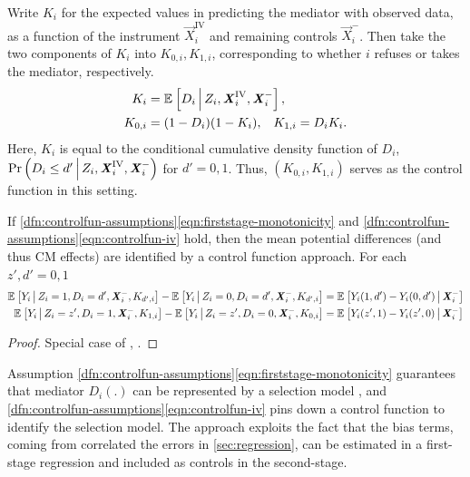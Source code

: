 Write $K_i$ for the expected values in predicting the mediator with observed data, as a function of the instrument $\vec X_i^{\text{IV}}$ and remaining controls $\vec X_i^-$.
Then take the two components of $K_i$ into $K_{0 ,i}, K_{1,i}$, corresponding to whether $i$ refuses or takes the mediator, respectively.
\begin{align*}
    K_i &= \mathbb{E}_{} \left[ D_i \, \middle\vert \, Z_i, \boldsymbol{\mathit{X}}_i^{\text{IV}}, \boldsymbol{\mathit{X}}_i^- \right], \\
    K_{0,i} &= (1 - D_i) (1 - K_i), \;\;\;K_{1,i} = D_i K_i.
\end{align*}
Here, $K_i$ is equal to the conditional cumulative density function of $D_i$, $\Pr\left( D_i \leq d' \, \middle\vert \, Z_i, \boldsymbol{\mathit{X}}_i^{\text{IV}}, \boldsymbol{\mathit{X}}_i^- \right)$ for $d' = 0,1$.
Thus, $\left( K_{0 ,i}, K_{1,i}\right)$ serves as the control function in this setting.
\begin{theorem}
    \label{thm:controlfun}
    If \ref{dfn:controlfun-assumptions}\eqref{eqn:firststage-monotonicity} and \ref{dfn:controlfun-assumptions}\eqref{eqn:controlfun-iv} hold, then the mean potential differences
    (and thus CM effects)
    are identified by a control function approach.
    For each $z', d' = 0,1$
    \begin{align*}
        \mathbb{E}_{} \left[ Y_i \, \middle\vert \, Z_i = 1, D_i = d', \boldsymbol{\mathit{X}}_i^-, K_{d',i} \right]
        - \mathbb{E}_{} \left[ Y_i \, \middle\vert \, Z_i = 0, D_i = d', \boldsymbol{\mathit{X}}_i^-, K_{d',i} \right] 
        &= \mathbb{E}_{} \left[ Y_i(1, d') - Y_i(0, d') \, \middle\vert \, \boldsymbol{\mathit{X}}_i^- \right] \\
        \mathbb{E}_{} \left[ Y_i \, \middle\vert \, Z_i = z', D_i = 1, \boldsymbol{\mathit{X}}_i^-, K_{1,i} \right]
        - \mathbb{E}_{} \left[ Y_i \, \middle\vert \, Z_i = z', D_i = 0, \boldsymbol{\mathit{X}}_i^-, K_{0,i} \right] 
        &= \mathbb{E}_{} \left[ Y_i(z', 1) - Y_i(z', 0) \, \middle\vert \, \boldsymbol{\mathit{X}}_i^- \right]
    \end{align*}
\end{theorem}
\begin{proof}
    Special case of \citet[Theorem~1]{florens2008identification}, \citet[Theorem~3]{imbens2009identification}.
\end{proof}

Assumption \ref{dfn:controlfun-assumptions}\eqref{eqn:firststage-monotonicity} guarantees that mediator $D_i(.)$ can be represented by a selection model \citep{vytlacil2002independence}, and \ref{dfn:controlfun-assumptions}\eqref{eqn:controlfun-iv} pins down a control function to identify the selection model.
The approach exploits the fact that the bias terms, coming from correlated the errors in \autoref{sec:regression}, can be estimated in a first-stage regression and included as controls in the second-stage.

